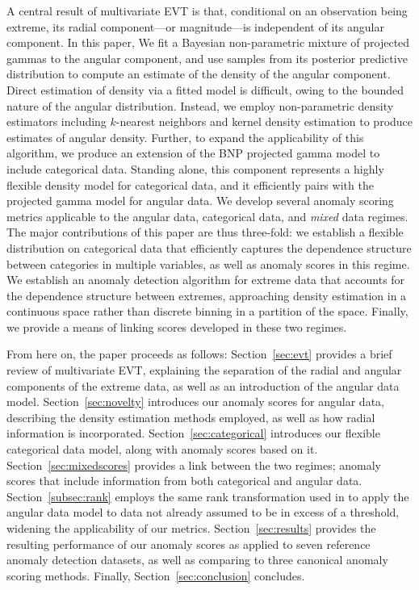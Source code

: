 A central result of multivariate EVT is that, conditional on an observation 
    being extreme, its radial component---or magnitude---is independent of its 
    angular component.  In this paper, We fit a Bayesian non-parametric mixture 
    of projected gammas to the angular component, and use samples from its 
    posterior predictive distribution to compute an estimate of the density 
    of the angular component.   Direct estimation of density via a fitted model
    is difficult, owing to the bounded nature of the angular distribution.  
    Instead, we employ non-parametric density estimators including $k$-nearest 
    neighbors and kernel density estimation to produce estimates of angular 
    density.  Further, to expand the applicability of this algorithm, we 
    produce an extension of the BNP projected gamma model to include categorical 
    data.   Standing alone, this component represents a highly flexible density 
    model for categorical data, and it efficiently pairs with the projected 
    gamma model for angular data.  We develop several anomaly scoring metrics 
    applicable to the angular data, categorical data, and \emph{mixed} data 
    regimes.  The major contributions of this paper are thus three-fold: we 
    establish a flexible distribution on categorical data that efficiently
    captures the dependence structure between categories in multiple variables, 
    as well as anomaly scores in this regime.  We establish an anomaly detection 
    algorithm for extreme data that accounts for the dependence structure 
    between extremes, approaching density estimation in a continuous space 
    rather than discrete binning in a partition of the space.  Finally, we 
    provide a means of linking scores developed in these two regimes.

From here on, the paper proceeds as follows: Section~\ref{sec:evt} provides a 
    brief review of multivariate EVT, explaining the separation of the radial 
    and angular components of the extreme data, as well as an introduction of 
    the angular data model.  Section~\ref{sec:novelty} introduces our anomaly 
    scores for angular data, describing the density estimation methods employed, 
    as well as how radial information is incorporated.  
    Section~\ref{sec:categorical} introduces our flexible categorical data 
    model, along with anomaly scores based on it. 
    Section~\ref{sec:mixedscores} provides a link between the two regimes; 
    anomaly scores that include information from both categorical and angular 
    data.  
    Section~\ref{subsec:rank} employs the same rank transformation used in 
    \cite{goix2017} to apply the angular data model to data not already assumed 
    to be in excess of a threshold, widening the applicability of our metrics.
    Section~\ref{sec:results} provides the resulting performance of our anomaly 
    scores as applied to seven reference anomaly detection datasets, as well as 
    comparing to three canonical anomaly scoring methods.  
    Finally, Section~\ref{sec:conclusion} concludes.

